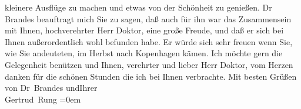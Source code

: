 \begin{ledgroupsized}[t]{13cm}
                    kleinere Ausflüge zu machen und etwas von der Schönheit zu genießen.\pend
           \pstart
           Dr Brandes beauftragt mich Sie {\pb}zu sagen, daß auch für ihn war das Zusammensein mit Ihnen, hochverehrter Herr
                    Doktor, eine große Freude, und daß er sich bei Ihnen außerordentlich wohl
                    befunden habe. Er würde sich sehr freuen wenn Sie, wie Sie andeuteten, im Herbst
                    nach Kopenhagen kämen.\pend
           \pstart
           Ich möchte gern die Gelegenheit benützen und Ihnen, verehrter und lieber Herr
                    Doktor, vom Herzen danken für die schönen Stunden die ich bei Ihnen
                    verbrachte.\pend
           \pstart
           Mit besten Grüßen von Dr Brandes
                        und\hspace*{2.5em}Ihrer{\\[\baselineskip]}\spacefill\mbox{Gertrud Rung}\pend
           \leftskip=0em{}\endnumbering{}\end{ledgroupsized}  \newcommand{\dateiname}{L02441}\newcommand{\titel}{Gertrud Rung an Arthur Schnitzler, 24. 5. 1925}\newcommand{\editorInnen}{Martin Anton Müller und Gerd-Hermann Susen}
      